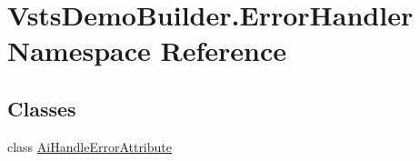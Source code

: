\hypertarget{namespace_vsts_demo_builder_1_1_error_handler}{}\section{Vsts\+Demo\+Builder.\+Error\+Handler Namespace Reference}
\label{namespace_vsts_demo_builder_1_1_error_handler}
\subsection*{Classes}
\begin{DoxyCompactItemize}
\item 
class \mbox{\hyperlink{class_vsts_demo_builder_1_1_error_handler_1_1_ai_handle_error_attribute}{Ai\+Handle\+Error\+Attribute}}
\end{DoxyCompactItemize}
